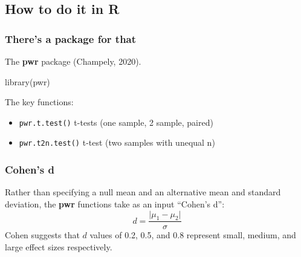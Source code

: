 \documentclass[a4paper]{article}\usepackage[]{graphicx}\usepackage[]{xcolor}
\begin{document}
\subsection{How to do it in R}
\subsubsection{There's a package for that}
The \textcolor{myred}{\textbf{pwr}} package (Champely, 2020).
\begin{Schunk}
\begin{Sinput}
library(pwr) 
\end{Sinput}
\end{Schunk}
The key functions:
\begin{itemize}
	\item \lstinline|pwr.t.test()| t-tests (one sample, 2 sample, paired)
	\item \lstinline|pwr.t2n.test()| t-test (two samples with unequal n)
\end{itemize}
\subsubsection{Cohen's d}
Rather than specifying a null mean and an alternative mean and standard deviation, the \textbf{pwr} functions take as an input ``Cohen's d'':
\[
	d = \frac{\lvert \mu_1 - \mu_2 \rvert}{\sigma}
\]
Cohen suggests that \( d \) values of 0.2, 0.5, and 0.8 represent small, medium, and large effect sizes respectively.
\end{document}
